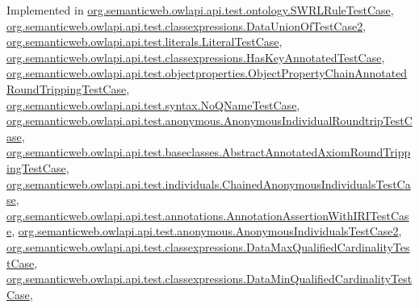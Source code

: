 Implemented in \hyperlink{classorg_1_1semanticweb_1_1owlapi_1_1api_1_1test_1_1ontology_1_1_s_w_r_l_rule_test_case_a012c274c17dd1bacf67f1375df0b98d7}{org.\-semanticweb.\-owlapi.\-api.\-test.\-ontology.\-S\-W\-R\-L\-Rule\-Test\-Case}, \hyperlink{classorg_1_1semanticweb_1_1owlapi_1_1api_1_1test_1_1classexpressions_1_1_data_union_of_test_case2_a5b8b8eca10816261c0e861e58ea985b0}{org.\-semanticweb.\-owlapi.\-api.\-test.\-classexpressions.\-Data\-Union\-Of\-Test\-Case2}, \hyperlink{classorg_1_1semanticweb_1_1owlapi_1_1api_1_1test_1_1literals_1_1_literal_test_case_a220f051a5e48d428ff1837db4c614871}{org.\-semanticweb.\-owlapi.\-api.\-test.\-literals.\-Literal\-Test\-Case}, \hyperlink{classorg_1_1semanticweb_1_1owlapi_1_1api_1_1test_1_1classexpressions_1_1_has_key_annotated_test_case_a084799ea3aa27a6d06855dcfc3d3652b}{org.\-semanticweb.\-owlapi.\-api.\-test.\-classexpressions.\-Has\-Key\-Annotated\-Test\-Case}, \hyperlink{classorg_1_1semanticweb_1_1owlapi_1_1api_1_1test_1_1objectproperties_1_1_object_property_chain_a3a9fed56e257c1f8bd9b45bc96275449_ab1b440df7aefab4d968ca3122be5b05b}{org.\-semanticweb.\-owlapi.\-api.\-test.\-objectproperties.\-Object\-Property\-Chain\-Annotated\-Round\-Tripping\-Test\-Case}, \hyperlink{classorg_1_1semanticweb_1_1owlapi_1_1api_1_1test_1_1syntax_1_1_no_q_name_test_case_a286a749e51545914fa9b77b0b0096def}{org.\-semanticweb.\-owlapi.\-api.\-test.\-syntax.\-No\-Q\-Name\-Test\-Case}, \hyperlink{classorg_1_1semanticweb_1_1owlapi_1_1api_1_1test_1_1anonymous_1_1_anonymous_individual_roundtrip_test_case_a4fe92c18a048ec8655b46e2cb2a1ab06}{org.\-semanticweb.\-owlapi.\-api.\-test.\-anonymous.\-Anonymous\-Individual\-Roundtrip\-Test\-Case}, \hyperlink{classorg_1_1semanticweb_1_1owlapi_1_1api_1_1test_1_1baseclasses_1_1_abstract_annotated_axiom_round_tripping_test_case_ac24380072dbd37bf4a7deead5c191283}{org.\-semanticweb.\-owlapi.\-api.\-test.\-baseclasses.\-Abstract\-Annotated\-Axiom\-Round\-Tripping\-Test\-Case}, \hyperlink{classorg_1_1semanticweb_1_1owlapi_1_1api_1_1test_1_1individuals_1_1_chained_anonymous_individuals_test_case_af44d53d08235ce7bc380485e73cace19}{org.\-semanticweb.\-owlapi.\-api.\-test.\-individuals.\-Chained\-Anonymous\-Individuals\-Test\-Case}, \hyperlink{classorg_1_1semanticweb_1_1owlapi_1_1api_1_1test_1_1annotations_1_1_annotation_assertion_with_i_r_i_test_case_aef6ade1278e2df6380236c0e9409e189}{org.\-semanticweb.\-owlapi.\-api.\-test.\-annotations.\-Annotation\-Assertion\-With\-I\-R\-I\-Test\-Case}, \hyperlink{classorg_1_1semanticweb_1_1owlapi_1_1api_1_1test_1_1anonymous_1_1_anonymous_individuals_test_case2_a0d2fd4f6cbedfa36d5bf468592c32bcd}{org.\-semanticweb.\-owlapi.\-api.\-test.\-anonymous.\-Anonymous\-Individuals\-Test\-Case2}, \hyperlink{classorg_1_1semanticweb_1_1owlapi_1_1api_1_1test_1_1classexpressions_1_1_data_max_qualified_cardinality_test_case_af645cdd127da39631e9c941696c8a8c4}{org.\-semanticweb.\-owlapi.\-api.\-test.\-classexpressions.\-Data\-Max\-Qualified\-Cardinality\-Test\-Case}, \hyperlink{classorg_1_1semanticweb_1_1owlapi_1_1api_1_1test_1_1classexpressions_1_1_data_min_qualified_cardinality_test_case_a9f897438121b9b48640132dcc1d0f36a}{org.\-semanticweb.\-owlapi.\-api.\-test.\-classexpressions.\-Data\-Min\-Qualified\-Cardinality\-Test\-Case}, 